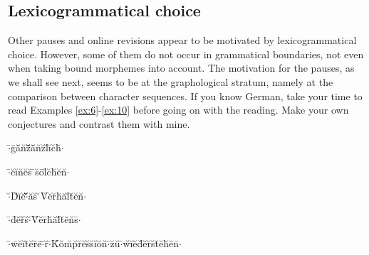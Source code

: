 \subsection{Lexicogrammatical choice}
\label{sec:LexicogrammaticalChoice}

Other pauses and online revisions appear to be motivated by lexicogrammatical choice. However, some of them do not occur in grammatical boundaries, not even when taking bound morphemes into account. The motivation for the pauses, as we shall see next, seems to be at the graphological stratum, namely at the comparison between character sequences. If you know German, take your time to read Examples \ref{ex:6}-\ref{ex:10} before going on with the reading. Make your own conjectures and contrast them with mine.

\begin{exe} %
  \ex\label{ex:6}$\cdot$\={ }g\={ }ä\u{ }n\u{ }z\={ }\uettl\u{ }\uettl\u{ }\uettl\={ }ä\u{ }n\u{ }z\u{ }l\u{ }i\u{ }c\u{ }h\u{ }$\cdot$
\end{exe}

\begin{exe} %
  \ex\label{ex:7}$\cdot$\={ }e\u{ }i\u{ }n\u{ }e\u{ }s\u{ } \={ }s\u{ }o\={ }l\u{ }c\u{ }h\u{ }e\u{ }n\u{ }$\cdot$
\end{exe}

\begin{exe} %
  \ex\label{ex:8}$\cdot$\u{ }D\u{ }i\u{ }e\u{ }$\cdot$\={ }\uettl\u{ }\uettl\u{ }\uettl\u{ }a\u{ }s\u{ } \u{ }V\u{ }e\u{ }r\u{ }h\u{ }a\u{ }l\u{ }t\u{ }e\u{ }n\u{ }$\cdot$
\end{exe}

\begin{exe} %
  \ex\label{ex:9}$\cdot$\={ }d\={ }e\u{ }r\={ }\uettl\u{ }s\u{ }$\cdot$\u{ }V\u{ }e\u{ }r\={ }h\u{ }a\u{ }l\u{ }t\u{ }e\u{ }n\u{ }s\={ }$\cdot$
\end{exe}

\begin{exe}
  \ex\label{ex:10}$\cdot$\={ }w\={ }e\u{ }i\u{ }t\={ }e\u{ }r\u{ }e\={ }$\cdot$\={ }\uettl\={ }r\u{ }$\cdot$\={ }K\u{ }o\u{ }m\u{ }p\u{ }r\u{ }e\u{ }s\u{ }s\u{ }i\u{ }o\u{ }n\u{ }$\cdot$\={ }z\u{ }u\u{ }$\cdot$\={ }w\u{ }i\u{ }e\u{ }d\u{ }e\u{ }r\u{ }s\u{ }t\u{ }e\u{ }h\u{ }e\u{ }n\={ }$\cdot$
\end{exe}

